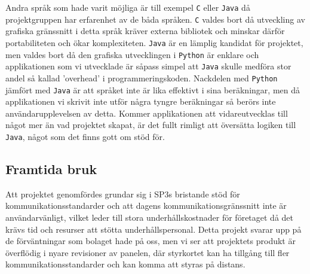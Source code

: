 \documentclass{article}
\begin{document}
            \noindent Andra språk som hade varit möjliga är till exempel \texttt{C} eller \texttt{Java} då projektgruppen har erfarenhet av de båda språken. \texttt{C} valdes bort då utveckling av grafiska gränssnitt i detta språk kräver externa bibliotek och minskar därför portabiliteten och ökar komplexiteten. \texttt{Java} är en lämplig kandidat för projektet, men valdes bort då den grafiska utvecklingen i \texttt{Python} är enklare och applikationen som vi utvecklade är såpass simpel att \texttt{Java} skulle medföra stor andel så kallad 'overhead' i programmeringskoden. Nackdelen med \texttt{Python} jämfört med \texttt{Java} är att språket inte är lika effektivt i sina beräkningar, men då applikationen vi skrivit inte utför några tyngre beräkningar så berörs inte användar\-upplevelsen  av detta. Kommer applikationen att vidareutvecklas till något mer än vad projektet skapat, är det fullt rimligt att översätta logiken till \texttt{Java}, något som det finns gott om stöd för.\cite{jython}
        
        \subsection{Framtida bruk} %
        \label{sub:framtida_bruk}
            Att projektet genomfördes grundar sig i SP3s bristande stöd för kommunikationsstandarder och att dagens kommunikationsgränssnitt inte är användarvänligt, vilket leder till stora underhållskostnader för företaget då det krävs tid och resurser att stötta underhållspersonal. Detta projekt svarar upp på de förväntningar som bolaget hade på oss, men vi ser att projektets produkt är överflödig i nyare revisioner av panelen, där styrkortet kan ha tillgång till fler kommunikationsstandarder och kan komma att styras på distans.

    \clearpage
    \printbibliography      
    
\end{document}
